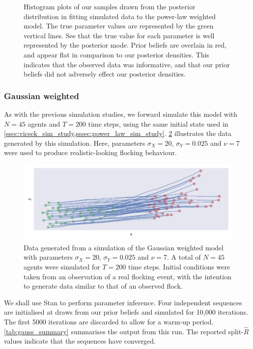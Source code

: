 \begin{figure}[tbp]
  \caption{Histogram plots of our samples drawn from the posterior distribution
    in fitting simulated data to the power-law weighted model. The true
    parameter values are represented by the green vertical lines. See that
    the true value for each parameter is well represented by the posterior
    mode. Prior beliefs are overlain in red, and appear flat in comparison to
    our posterior densities. This indicates that the observed data was
    informative, and that our prior beliefs did not adversely effect our
    posterior densities.}
  \label{fig:power_hist}
\end{figure}

\subsubsection{Gaussian weighted}

As with the previous simulation studies, we forward simulate this model with
$N=45$ agents and $T=200$ time steps, using the same initial state used in
\cref{ssec:vicsek_sim_study,sssec:power_law_sim_study}. \cref{fig:gauss_sim}
illustrates the data generated by this simulation. Here, parameters
$\sigma_X=20$, $\sigma_Y=0.025$ and $\nu=7$ were used to produce
realistic-looking flocking behaviour.

\begin{figure}[tbp]
  \includegraphics{gauss/gauss_sim.pdf}
  \caption{Data generated from a simulation of the Gaussian weighted model with
    parameters $\sigma_X=20$, $\sigma_Y=0.025$ and $\nu=7$. A total of $N=45$
    agents were simulated for $T=200$ time steps. Initial conditions
    were taken from an observation of a real flocking event, with the intention
    to generate data similar to that of an observed flock.}
  \label{fig:gauss_sim}
\end{figure}

We shall use Stan to perform parameter inference. Four independent sequences
are initialised at draws from our prior beliefs and simulated for 10,000
iterations. The first 5000 iterations are discarded to allow for a warm-up
period. \cref{tab:gauss_summary} summarises the output from this run. The
reported split-$\widehat{R}$ values indicate that the sequences have converged.

